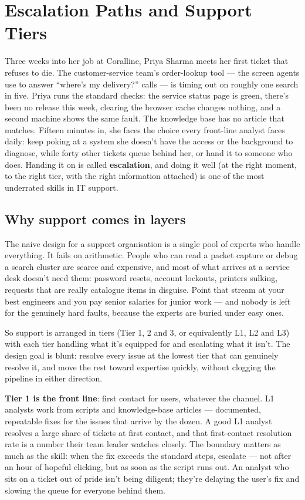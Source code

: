 \section{Escalation Paths and Support Tiers}
Three weeks into her job at Coralline, Priya Sharma meets her first ticket that refuses to die. The customer-service team's order-lookup tool — the screen agents use to answer ``where's my delivery?'' calls — is timing out on roughly one search in five. Priya runs the standard checks: the service status page is green, there's been no release this week, clearing the browser cache changes nothing, and a second machine shows the same fault. The knowledge base has no article that matches. Fifteen minutes in, she faces the choice every front-line analyst faces daily: keep poking at a system she doesn't have the access or the background to diagnose, while forty other tickets queue behind her, or hand it to someone who does. Handing it on is called \textbf{escalation}, and doing it well (at the right moment, to the right tier, with the right information attached) is one of the most underrated skills in IT support.



\subsection{Why support comes in layers}


The naive design for a support organisation is a single pool of experts who handle everything. It fails on arithmetic. People who can read a packet capture or debug a search cluster are scarce and expensive, and most of what arrives at a service desk doesn't need them: password resets, account lockouts, printers sulking, requests that are really catalogue items in disguise. Point that stream at your best engineers and you pay senior salaries for junior work — and nobody is left for the genuinely hard faults, because the experts are buried under easy ones.


So support is arranged in tiers (Tier 1, 2 and 3, or equivalently L1, L2 and L3) with each tier handling what it's equipped for and escalating what it isn't. The design goal is blunt: resolve every issue at the lowest tier that can genuinely resolve it, and move the rest toward expertise quickly, without clogging the pipeline in either direction.


\textbf{Tier 1 is the front line}: first contact for users, whatever the channel. L1 analysts work from scripts and knowledge-base articles — documented, repeatable fixes for the issues that arrive by the dozen. A good L1 analyst resolves a large share of tickets at first contact, and that first-contact resolution rate is a number their team leader watches closely. The boundary matters as much as the skill: when the fix exceeds the standard steps, escalate — not after an hour of hopeful clicking, but as soon as the script runs out. An analyst who sits on a ticket out of pride isn't being diligent; they're delaying the user's fix and slowing the queue for everyone behind them.


